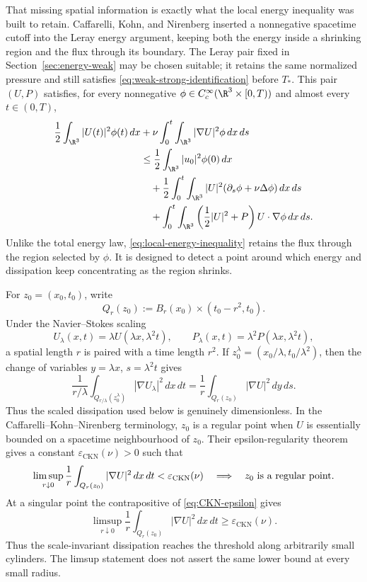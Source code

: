 That missing spatial information is exactly what the local energy inequality
was built to retain.  Caffarelli, Kohn, and Nirenberg inserted a nonnegative
spacetime cutoff into the Leray energy argument, keeping both the energy
inside a shrinking region and the flux through its boundary.  The Leray pair
fixed in Section~\ref{sec:energy-weak} may be chosen suitable; it retains the
same normalized pressure and still satisfies
\eqref{eq:weak-strong-identification} before \(T_*\).  This pair \((U,P)\)
satisfies, for every nonnegative
\(\phi\in C_c^\infty(\R^3\times[0,T))\) and almost every \(t\in(0,T)\),
\begin{equation}
\begin{aligned}
 \frac12\int_{\R^3}|U(t)|^2\phi(t)\,dx
 &+\nu\int_0^t\int_{\R^3}|\nabla U|^2\phi\,dx\,ds\\
 &\le \frac12\int_{\R^3}|u_0|^2\phi(0)\,dx\\
 &\quad+\frac12\int_0^t\int_{\R^3}
 |U|^2(\partial_s\phi+\nu\Delta\phi)\,dx\,ds\\
 &\quad+\int_0^t\int_{\R^3}
 \left(\frac12|U|^2+P\right)U\cdot\nabla\phi\,dx\,ds.
\end{aligned}
\label{eq:local-energy-inequality}
\end{equation}
Unlike the total energy law, \eqref{eq:local-energy-inequality} retains the
flux through the region selected by \(\phi\).  It is designed to detect a
point around which energy and dissipation keep concentrating as the region
shrinks.

For \(z_0=(x_0,t_0)\), write
\[
 Q_r(z_0):=B_r(x_0)\times(t_0-r^2,t_0).
\]
Under the Navier--Stokes scaling
\[
 U_\lambda(x,t)=\lambda U(\lambda x,\lambda^2t),
 \qquad
 P_\lambda(x,t)=\lambda^2P(\lambda x,\lambda^2t),
\]
a spatial length \(r\) is paired with a time length \(r^2\).  If
\(z_0^\lambda=(x_0/\lambda,t_0/\lambda^2)\), then the change of variables
\(y=\lambda x\), \(s=\lambda^2t\) gives
\[
 \frac{1}{r/\lambda}
 \int_{Q_{r/\lambda}(z_0^\lambda)}|\nabla U_\lambda|^2\,dx\,dt
 =\frac1r\int_{Q_r(z_0)}|\nabla U|^2\,dy\,ds.
\]
Thus the scaled dissipation used below is genuinely dimensionless.  In the
Caffarelli--Kohn--Nirenberg terminology, \(z_0\) is a regular point when \(U\)
is essentially bounded on a spacetime neighbourhood of \(z_0\).  Their
epsilon-regularity theorem gives a constant
\(\varepsilon_{\mathrm{CKN}}(\nu)>0\) such that
\begin{equation}
 \limsup_{r\downarrow0}\frac1r
 \int_{Q_r(z_0)}|\nabla U|^2\,dx\,dt
 <\varepsilon_{\mathrm{CKN}}(\nu)
 \quad\Longrightarrow\quad
 z_0\ \hbox{is a regular point}.
 \label{eq:CKN-epsilon}
\end{equation}
At a singular point the contrapositive of \eqref{eq:CKN-epsilon} gives
\[
 \limsup_{r\downarrow0}\frac1r
 \int_{Q_r(z_0)}|\nabla U|^2\,dx\,dt
 \ge\varepsilon_{\mathrm{CKN}}(\nu).
\]
Thus the scale-invariant dissipation reaches the threshold along arbitrarily
small cylinders.  The limsup statement does not assert the same lower bound
at every small radius.

